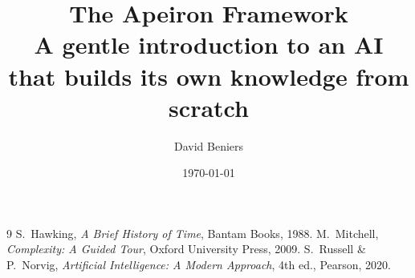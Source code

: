 \documentclass[11pt,a4paper]{article}
\title{\textbf{The Apeiron Framework}\\[0.3em]
\Large A gentle introduction to an AI that builds its own knowledge from scratch}
\author{David Beniers}
\date{\today}
\begin{document}
\maketitle
\thispagestyle{empty}
\vspace*{\fill}
\newpage




































\begin{thebibliography}{9}
 S.~Hawking, \textit{A Brief History of Time},
Bantam Books, 1988.
 M.~Mitchell, \textit{Complexity: A Guided Tour},
Oxford University Press, 2009.
 S.~Russell \& P.~Norvig,
\textit{Artificial Intelligence: A Modern Approach}, 4th ed., Pearson, 2020.
\end{thebibliography}
\end{document}
